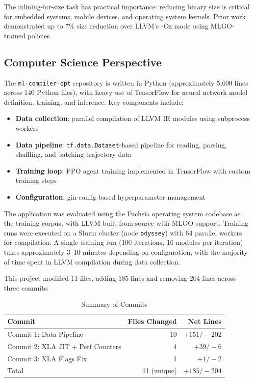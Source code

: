 \documentclass[10pt]{article}
\begin{document}
The inlining-for-size task has practical importance: reducing binary size is critical for embedded systems, mobile devices, and operating system kernels. Prior work \cite{mlgo2021} demonstrated up to 7\% size reduction over LLVM's -Oz mode using MLGO-trained policies.

\subsection{Computer Science Perspective}

The \texttt{ml-compiler-opt} repository is written in Python (approximately 5,600 lines across 140 Python files), with heavy use of TensorFlow for neural network model definition, training, and inference. Key components include:

\begin{itemize}
    \item \textbf{Data collection}: parallel compilation of LLVM IR modules using subprocess workers
    \item \textbf{Data pipeline}: \texttt{tf.data.Dataset}-based pipeline for reading, parsing, shuffling, and batching trajectory data
    \item \textbf{Training loop}: PPO agent training implemented in TensorFlow with custom training steps
    \item \textbf{Configuration}: gin-config based hyperparameter management
\end{itemize}

The application was evaluated using the Fuchsia operating system codebase as the training corpus, with LLVM built from source with MLGO support. Training runs were executed on a Slurm cluster (node \texttt{odyssey}) with 64 parallel workers for compilation. A single training run (100 iterations, 16 modules per iteration) takes approximately 3--10 minutes depending on configuration, with the majority of time spent in LLVM compilation during data collection.

This project modified 11 files, adding 185 lines and removing 204 lines across three commits:

\begin{table}[H]
\centering
\caption{Summary of Commits}
\begin{tabular}{lrr}
\toprule
Commit & Files Changed & Net Lines \\
\midrule
Commit 1: Data Pipeline & 10 & $+151/-202$ \\
Commit 2: XLA JIT + Perf Counters & 4 & $+39/-6$ \\
Commit 3: XLA Flags Fix & 1 & $+1/-2$ \\
\midrule
Total & 11 (unique) & $+185/-204$ \\
\bottomrule
\end{tabular}
\end{table}
\end{document}

